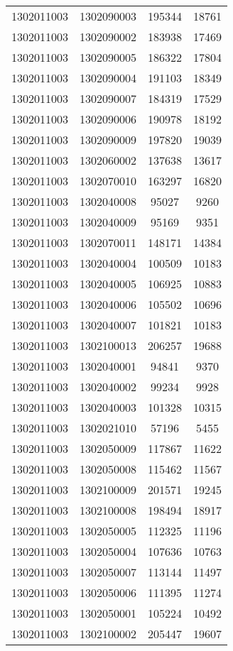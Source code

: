 \begin{longtable}[h]{llcc}
		1302011003 & 1302090003 & 195344 & 18761\\
		1302011003 & 1302090002 & 183938 & 17469\\
		1302011003 & 1302090005 & 186322 & 17804\\
		1302011003 & 1302090004 & 191103 & 18349\\
		1302011003 & 1302090007 & 184319 & 17529\\
		1302011003 & 1302090006 & 190978 & 18192\\
		1302011003 & 1302090009 & 197820 & 19039\\
		1302011003 & 1302060002 & 137638 & 13617\\
		1302011003 & 1302070010 & 163297 & 16820\\
		1302011003 & 1302040008 & 95027 & 9260\\
		1302011003 & 1302040009 & 95169 & 9351\\
		1302011003 & 1302070011 & 148171 & 14384\\
		1302011003 & 1302040004 & 100509 & 10183\\
		1302011003 & 1302040005 & 106925 & 10883\\
		1302011003 & 1302040006 & 105502 & 10696\\
		1302011003 & 1302040007 & 101821 & 10183\\
		1302011003 & 1302100013 & 206257 & 19688\\
		1302011003 & 1302040001 & 94841 & 9370\\
		1302011003 & 1302040002 & 99234 & 9928\\
		1302011003 & 1302040003 & 101328 & 10315\\
		1302011003 & 1302021010 & 57196 & 5455\\
		1302011003 & 1302050009 & 117867 & 11622\\
		1302011003 & 1302050008 & 115462 & 11567\\
		1302011003 & 1302100009 & 201571 & 19245\\
		1302011003 & 1302100008 & 198494 & 18917\\
		1302011003 & 1302050005 & 112325 & 11196\\
		1302011003 & 1302050004 & 107636 & 10763\\
		1302011003 & 1302050007 & 113144 & 11497\\
		1302011003 & 1302050006 & 111395 & 11274\\
		1302011003 & 1302050001 & 105224 & 10492\\
		1302011003 & 1302100002 & 205447 & 19607\\

\end{longtable}
